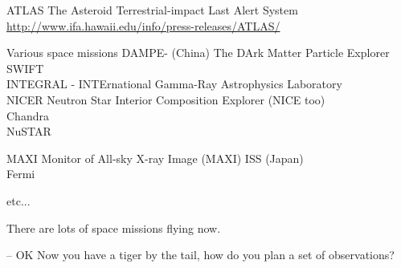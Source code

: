 \documentclass[letter,11pt,oneside]{article}
\begin{document}
ATLAS The Asteroid Terrestrial-impact Last Alert System
\url{http://www.ifa.hawaii.edu/info/press-releases/ATLAS/}

Various space missions
DAMPE-  (China) The DArk Matter Particle Explorer \\
SWIFT \\
INTEGRAL - INTErnational Gamma-Ray Astrophysics Laboratory \\
NICER  Neutron Star Interior Composition Explorer (NICE too) \\
Chandra \\
NuSTAR

MAXI Monitor of All-sky X-ray Image (MAXI) ISS (Japan) \\
Fermi 

etc...

There are lots of space missions flying now.


-- OK Now you have a tiger by the tail, how do you plan
a set of observations?












\end{document}
